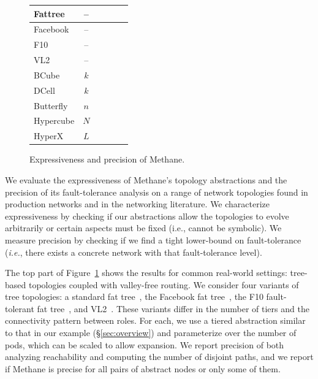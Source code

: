 \documentclass[numbers, 10pt, preprint]{sigplanconf}
\newcommand{\cmark}{\ding{51}}
\newcommand{\xmark}{\ding{55}}
\newcommand{\IE}{\emph{i.e.}}
\newcommand{\sysname}{{\small \sf Methane}\xspace}
\begin{document}
\begin{figure}[t!]
\begin{center}
\begin{tabular}{| l | c| c | c | c | c | }
      Fattree~\cite{fattree} & -- & \cmark & \cmark & \cmark & \xmark  \\ \hline
      Facebook~\cite{facebook-fattree} & -- & \cmark & \cmark & \cmark & \cmark \\ \hline
      F10~\cite{f10-fattree} & -- & \cmark & \cmark & \cmark & \xmark \\ \hline
      VL2~\cite{vl2-fattree} & -- & \cmark & \cmark & \cmark & \xmark \\ \hline
      BCube~\cite{bcube} & $k$ & \cmark & \cmark & \xmark & \xmark \\ \hline
      DCell~\cite{dcell} & $k$ & \cmark & \cmark & \xmark & \xmark \\ \hline
      Butterfly~\cite{butterfly} & $n$ & \cmark & \cmark & \cmark & \cmark \\ \hline
      Hypercube & $N$ & \cmark & \cmark & \cmark & \cmark \\ \hline
      HyperX~\cite{hyperx} & $L$ & \cmark & \cmark & \cmark & \cmark \\ \hline
      \end{tabular}
  \end{center}
  \vspace{-.6em}
  \caption{Expressiveness and precision of \sysname.}
  \label{fig:analysis-precision}
  \vspace{-1em}
\end{figure}


We evaluate the expressiveness of \sysname's topology abstractions and the precision of its fault-tolerance analysis on a range of network topologies found in production networks and in the networking literature. We characterize expressiveness by checking if our abstractions allow the topologies to evolve arbitrarily or certain aspects must be fixed (i.e., cannot be symbolic). We measure precision by checking if we find a tight lower-bound on fault-tolerance (\IE, there exists a concrete network with that fault-tolerance level).

The top part of Figure~\ref{fig:analysis-precision} shows the results for common real-world settings: tree-based topologies coupled with valley-free routing.
We consider four variants of tree topologies: a standard fat tree~\cite{fattree}, the Facebook fat tree~\cite{facebook-fattree}, the F10 fault-tolerant fat tree~\cite{f10-fattree}, and VL2~\cite{vl2-fattree}. These variants differ in the number of tiers and the connectivity pattern between roles. For each, we use a tiered abstraction similar to that in our example (\S\ref{sec:overview}) and parameterize over the number of pods, which can be scaled to allow expansion. We report precision of both analyzing reachability and computing the number of disjoint paths, and we report if \sysname is precise for all pairs of abstract nodes or only some of them. %
\end{document}
